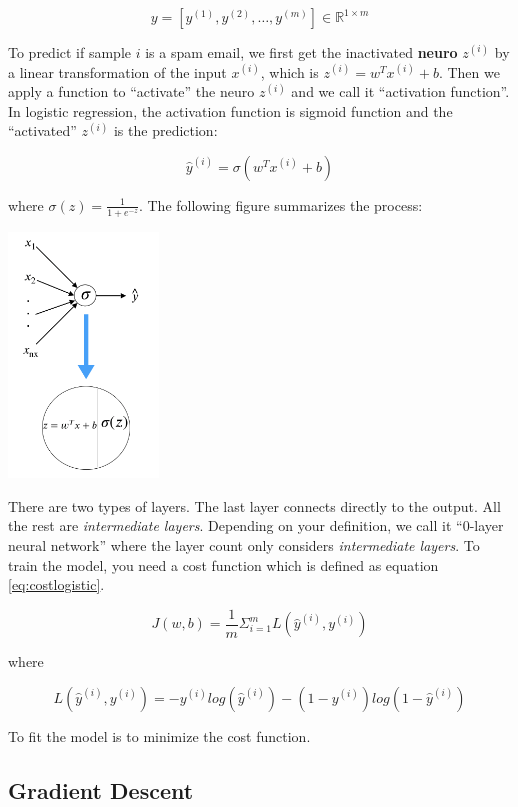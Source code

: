 \documentclass[12pt,]{krantz}
\begin{document}
\[y=[y^{(1)},y^{(2)},\dots,y^{(m)}] \in \mathbb{R}^{1 \times m}\]

To predict if sample \(i\) is a spam email, we first get the inactivated \textbf{neuro} \(z^{(i)}\) by a linear transformation of the input \(x^{(i)}\), which is \(z^{(i)}=w^Tx^{(i)} + b\). Then we apply a function to ``activate'' the neuro \(z^{(i)}\) and we call it ``activation function''. In logistic regression, the activation function is sigmoid function and the ``activated'' \(z^{(i)}\) is the prediction:

\[\hat{y}^{(i)} = \sigma(w^Tx^{(i)} + b)\]

where \(\sigma(z) = \frac{1}{1+e^{-z}}\). The following figure summarizes the process:

\includegraphics[width=0.3\textwidth,height=\textheight]{images/dnn0.png}

There are two types of layers. The last layer connects directly to the output. All the rest are \emph{intermediate layers}. Depending on your definition, we call it ``0-layer neural network'' where the layer count only considers \emph{intermediate layers}. To train the model, you need a cost function which is defined as equation \eqref{eq:costlogistic}.

\begin{equation}
J(w,b)=\frac{1}{m} \Sigma_{i=1}^m L(\hat{y}^{(i)}, y^{(i)})
\label{eq:costlogistic}
\end{equation}

where

\[L(\hat{y}^{(i)}, y^{(i)}) =  -y^{(i)}log(\hat{y}^{(i)})-(1-y^{(i)})log(1-\hat{y}^{(i)})\]

To fit the model is to minimize the cost function.

\hypertarget{gradient-descent}{%
\subsection{Gradient Descent}\label{gradient-descent}}
\end{document}
